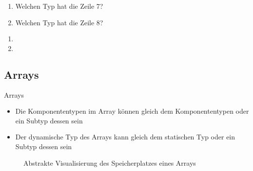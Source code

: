 \documentclass{../tuda-beamer}
\begin{document}
    \begin{frame}[c]
        \begin{enumerate}
            \item Welchen Typ hat die Zeile 7?
            \item Welchen Typ hat die Zeile 8?
        \end{enumerate}
        

        \pause
        \begin{enumerate}
            \item {}
            \item {}
        \end{enumerate}
    \end{frame}

    \subsection{Arrays}
    \label{subsec:arrays}
    \begin{frame}[c]{Arrays}
        \begin{itemize}
            \item Die Komponententypen im Array können gleich dem Komponententypen oder ein
            Subtyp dessen sein
            \item Der dynamische Typ des Arrays kann gleich dem statischen Typ oder ein Subtyp
            dessen sein
        \end{itemize}

        \begin{figure}[h]
            \centering
            \begin{memory}[scale=.725]
            \end{memory}
            \caption{Abstrakte Visualisierung des Speicherplatzes eines Arrays }
            \label{fig:array}
        \end{figure}
    \end{frame}
\end{document}
